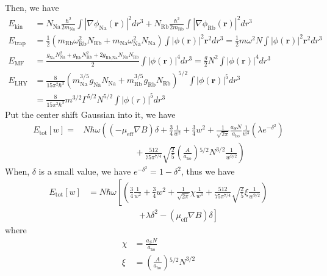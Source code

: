 Then, we have 
\begin{equation}
\begin{split}
E_{\text{kin}}&=N_{\text{Na}}\frac{\hbar^2}{2m_{\text{Na}}}\int\left|\nabla\phi_{\text{Na}}(\pmb{r})\right|^2dr^3+N_{\text{Rb}}\frac{\hbar^2}{2m_{\text{Rb}}}\int\left|\nabla\phi_{\text{Rb}}(\pmb{r})\right|^2dr^3\\
E_{\text{trap}}&=\frac{1}{2}\left(m_{\text{Rb}}\omega_{\text{Rb}}^2N_{\text{Rb}}+m_{\text{Na}}\omega_{\text{Na}}^2N_{\text{Na}}\right)\int\left|\phi(\pmb{r})\right|^2\pmb{r}^2dr^3=\frac{1}{2}m\omega^2N\int\left|\phi(\pmb{r})\right|^2\pmb{r}^2dr^3\\
E_{\text{MF}}&=\frac{g_{\text{Na}}N_{\text{Na}}^2+g_{\text{Rb}}N_{\text{Rb}}^2+2g_{\text{Rb},\text{Na}}N_{\text{Na}}N_{\text{Rb}}}{2}\int\left|\phi(\pmb{r})\right|^4dr^3=\frac{g}{2}N^2\int\left|\phi(\pmb{r})\right|^4dr^3\\
E_{\text{LHY}}&=\frac{8}{15\pi^2\hbar^3}\left(m_{\text{Na}}^{3/5}g_{\text{Na}}N_{\text{Na}}+m_{\text{Rb}}^{3/5}g_{\text{Rb}}N_{\text{Rb}}\right)^{5/2}\int\left|\phi(\pmb{r})\right|^5dr^3\\
&=\frac{8}{15\pi^2\hbar^3}m^{3/2}\Gamma^{5/2}N^{5/2}\int\left|\phi (r)\right|^5dr^3
\end{split}
\end{equation}
Put the center shift Gaussian into it, we have
\begin{equation}
\begin{split}
E_{\text{tot}}[w]=&N\hbar\omega\left(\left(-\mu_{\text{eff}}\nabla B\right)\delta +\frac{3}{4}\frac{1}{w^2}+\frac{3}{4}w^2+\frac{1}{\sqrt{2\pi}}\frac{a_SN}{a_{\text{ho}}}\frac{1}{w^3}\left(\lambda e^{-\delta^2}\right)\right.\\
&\left.\qquad\qquad\qquad+\frac{512}{75\pi^{7/4}}\sqrt{\frac{2}{5}}\left(\frac{A}{a_{\text{ho}}}\right){}^{5/2}N^{3/2}\frac{1}{w^{9/2}}\right)
\end{split}
\end{equation}
When, $\delta $ is a small value, we have $e^{-\delta ^2}=1-\delta ^2$, thus we have
\begin{equation}
\begin{split}
E_{\text{tot}}[w]&=N\hbar\omega\left[\left(\frac{3}{4}\frac{1}{w^2}+\frac{3}{4}w^2+\frac{1}{\sqrt{2\pi}}\chi\frac{1}{w^3}+\frac{512}{75\pi^{7/4}}\sqrt{\frac{2}{5}}\xi\frac{1}{w^{9/2}}\right)\right.\\\
&\qquad\qquad\qquad\left.+\lambda\delta^2-\left(\mu_{\text{eff}}\nabla B\right)\delta\right]
\end{split}
\end{equation}
where
\begin{equation}
\begin{split}
\chi&=\frac{a_SN}{a_{\text{ho}}}\\
\xi&=\left(\frac{A}{a_{\text{ho}}}\right){}^{5/2}N^{3/2}
\end{split}
\end{equation}

